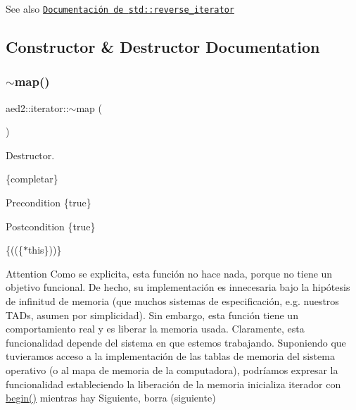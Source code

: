 \begin{DoxySeeAlso}{See also}
\href{http://en.cppreference.com/w/cpp/iterator/reverse_iterator}{\tt Documentación de {\ttfamily std\+::reverse\+\_\+iterator}} 
\end{DoxySeeAlso}


\subsection{Constructor \& Destructor Documentation}
\mbox{\label{classaed2_1_1iterator_a769d0ae1a1c7ed66acdd321e44fcd0e1}} 
\subsubsection{\texorpdfstring{$\sim$map()}{~map()}}
{\footnotesize\ttfamily aed2\+::iterator\+::$\sim$map (\begin{DoxyParamCaption}{ }\end{DoxyParamCaption})\hspace{0.3cm}{\ttfamily [inline]}}



Destructor. 

\{completar\}

\begin{DoxyPrecond}{Precondition}
\{true\} 
\end{DoxyPrecond}
\begin{DoxyPostcond}{Postcondition}
\{true\}
\end{DoxyPostcond}
\{((\{$\ast$this\}))\}

\begin{DoxyAttention}{Attention}
Como se explicita, esta función no hace nada, porque no tiene un objetivo funcional. De hecho, su implementación es innecesaria bajo la hipótesis de infinitud de memoria (que muchos sistemas de especificación, e.\+g. nuestros T\+A\+Ds, asumen por simplicidad). Sin embargo, esta función tiene un comportamiento real y es liberar la memoria usada. Claramente, esta funcionalidad depende del sistema en que estemos trabajando. Suponiendo que tuvieramos acceso a la implementación de las tablas de memoria del sistema operativo (o al mapa de memoria de la computadora), podríamos expresar la funcionalidad estableciendo la liberación de la memoria inicializa iterador con \hyperlink{classaed2_1_1iterator_af8901de173468531c58458b581d345a6}{begin()} mientras hay Siguiente, borra (siguiente) 
\end{DoxyAttention}


